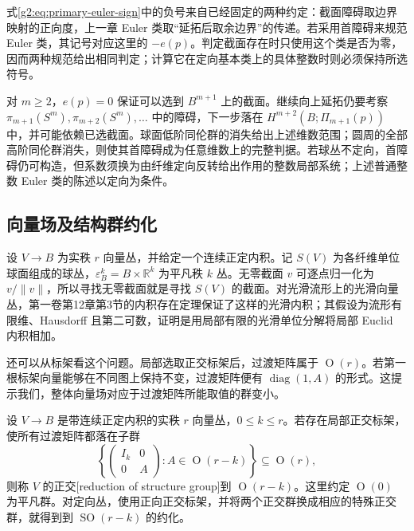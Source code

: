 式\eqref{g2:eq:primary-euler-sign}中的负号来自已经固定的两种约定：截面障碍取边界映射的正向度，上一章 Euler 类取“延拓后取余边界”的传递。若采用首障碍来规范 Euler 类，其记号对应这里的 \(-e(p)\)。判定截面存在时只使用这个类是否为零，因而两种规范给出相同判定；计算它在定向基本类上的具体整数时则必须保持所选符号。

\ProseParagraphBreak

对 \(m\ge2\)，\(e(p)=0\) 保证可以选到 \(B^{m+1}\) 上的截面。继续向上延拓仍要考察 \(\pi_{m+1}(S^m),\pi_{m+2}(S^m),\ldots\) 中的障碍，下一步落在 \(H^{m+2}(B;\Pi_{m+1}(p))\) 中，并可能依赖已选截面。球面低阶同伦群的消失给出上述维数范围；圆周的全部高阶同伦群消失，则使其首障碍成为任意维数上的完整判据。若球丛不定向，首障碍仍可构造，但系数须换为由纤维定向反转给出作用的整数局部系统；上述普通整数 Euler 类的陈述以定向为条件。

\subsection{向量场及结构群约化}
\label{g2:subsec:1204:02}
设 \(V\rightarrow B\) 为实秩 \(r\) 向量丛，并给定一个连续正定内积。记 \(S(V)\) 为各纤维单位球面组成的球丛，\(\varepsilon_B^k=B\times\mathbb R^k\) 为平凡秩 \(k\) 丛。无零截面 \(v\) 可逐点归一化为 \(v/\|v\|\)，所以寻找无零截面就是寻找 \(S(V)\) 的截面。对光滑流形上的光滑向量丛，第一卷第12章第3节的内积存在定理保证了这样的光滑内积；其假设为流形有限维、Hausdorff 且第二可数，证明是用局部有限的光滑单位分解将局部 Euclid 内积相加。

\ProseParagraphBreak

还可以从标架看这个问题。局部选取正交标架后，过渡矩阵属于 \(\operatorname O(r)\)。若第一根标架向量能够在不同图上保持不变，过渡矩阵便有 \(\operatorname{diag}(1,A)\) 的形式。这提示我们，整体向量场对应于过渡矩阵所能取值的群变小。

\begin{definition}[正交结构群约化]\label{g2:def:orthogonal-reduction}
	设 \(V\rightarrow B\) 是带连续正定内积的实秩 \(r\) 向量丛，\(0\le k\le r\)。若存在局部正交标架，使所有过渡矩阵都落在子群
	\[
		\left\{\begin{pmatrix}I_k&0\\0&A\end{pmatrix}:A\in\operatorname O(r-k)\right\}\subseteq\operatorname O(r),
	\]
	则称 \(V\) 的正交[reduction of structure group]到 \(\operatorname O(r-k)\)。这里约定 \(\operatorname O(0)\) 为平凡群。对定向丛，使用正向正交标架，并将两个正交群换成相应的特殊正交群，就得到到 \(\operatorname{SO}(r-k)\) 的约化。
\end{definition}

